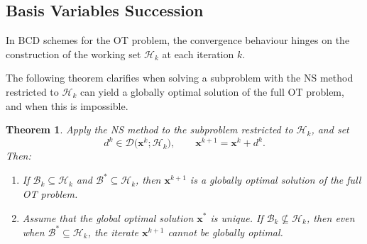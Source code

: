 \documentclass[12pt,a4paper]{article}
\newtheorem{theorem}{Theorem} %
\begin{document}
\subsection{Basis Variables Succession}




In BCD schemes for the OT problem, the convergence behaviour hinges on the construction
of the working set \(\mathcal H_{k}\) at each iteration \(k\).

The following theorem clarifies when solving a subproblem with the NS method
restricted to \(\mathcal H_k\) can yield a globally optimal solution of the full OT problem,
and when this is impossible.

\begin{theorem}\label{thm:NS-global}
Apply the NS method to the subproblem restricted to \(\mathcal H_{k}\), and set
\[
d^{k}\in\mathcal D\bigl(\mathbf{x}^{k};\mathcal H_{k}\bigr),
\qquad
\mathbf{x}^{k+1}=\mathbf{x}^{k}+d^{k}.
\]
Then:
\begin{enumerate}
  \item[\textnormal{(i)}]
  If \(\mathcal B_k\subseteq \mathcal H_k\) and \(\mathcal B^\ast\subseteq \mathcal H_k\),
  then \(\mathbf{x}^{k+1}\) is a globally optimal solution of the full OT problem.

  \item[\textnormal{(ii)}]
  Assume that the global optimal solution \(\mathbf{x}^\ast\) is \emph{unique}.
  If \(\mathcal{B}_{k}\not\subseteq\mathcal H_{k}\),
  then even when \(\mathcal B^\ast\subseteq \mathcal H_k\),
  the iterate \(\mathbf{x}^{k+1}\) cannot be globally optimal.
\end{enumerate}
\end{theorem}
\end{document}
